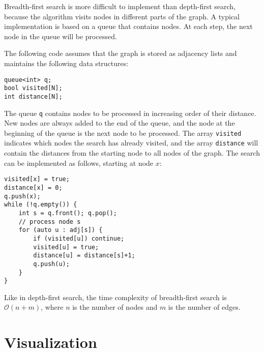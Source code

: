 \documentclass[twoside,12pt,a4paper,english]{book}
\theoremstyle{definition}
\theoremstyle{problemstyle}
\begin{document}
Breadth-first search is more difficult
to implement than depth-first search,
because the algorithm visits nodes
in different parts of the graph.
A typical implementation is based on
a queue that contains nodes.
At each step, the next node in the queue
will be processed.

The following code assumes that the graph is stored
as adjacency lists and maintains the following
data structures:
\begin{lstlisting}
queue<int> q;
bool visited[N];
int distance[N];
\end{lstlisting}

The queue \texttt{q}
contains nodes to be processed
in increasing order of their distance.
New nodes are always added to the end
of the queue, and the node at the beginning
of the queue is the next node to be processed.
The array \texttt{visited} indicates
which nodes the search has already visited,
and the array \texttt{distance} will contain the
distances from the starting node to all nodes of the graph.
\newpage
The search can be implemented as follows,
starting at node $x$:
\begin{lstlisting}
visited[x] = true;
distance[x] = 0;
q.push(x);
while (!q.empty()) {
    int s = q.front(); q.pop();
    // process node s
    for (auto u : adj[s]) {
        if (visited[u]) continue;
        visited[u] = true;
        distance[u] = distance[s]+1;
        q.push(u);
    }
}
\end{lstlisting}

Like in depth-first search,
the time complexity of breadth-first search
is $\mathcal{O}(n+m)$, where $n$ is the number of nodes
and $m$ is the number of edges.

\section{Visualization}

\begin{center}
\end{center}
\end{document}
